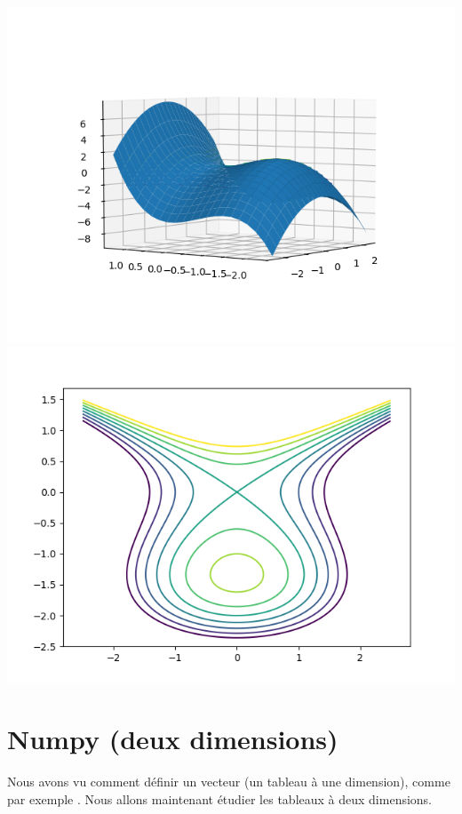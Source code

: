 \documentclass[11pt,class=report,crop=false]{standalone}
\begin{document}
\begin{center}
  \includegraphics[scale=\myscale,scale=0.4]{figures/pythonxy-intro2}
  \quad
\includegraphics[scale=\myscale,scale=0.4]{figures/pythonxy-intro3}
\end{center}

\section{Numpy (deux dimensions)}

Nous avons vu comment définir un vecteur (un tableau à une dimension), comme par exemple \ci{[1 2 3 4]}. Nous allons maintenant étudier les tableaux à deux dimensions.
\end{document}
